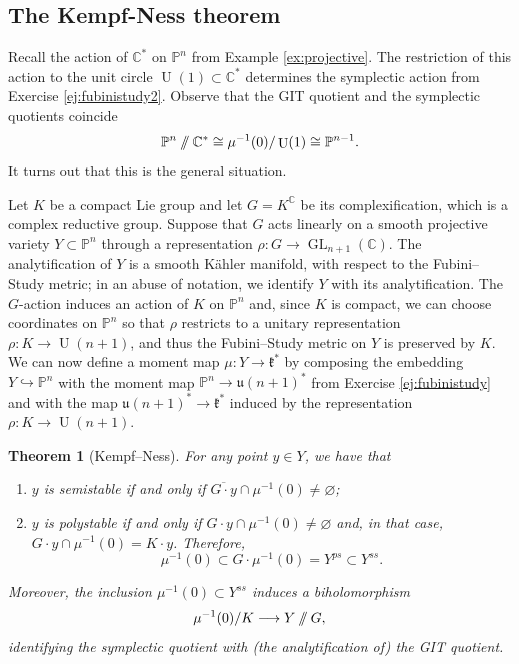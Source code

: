 \documentclass[12pt,a4paper]{amsbook}
\newtheorem{thm}{Theorem}[chapter]
\theoremstyle{remark} \newtheorem{rmk}[thm]{Remark}
\theoremstyle{definition} \newtheorem{defn}[thm]{Definition}
\theoremstyle{definition} \newtheorem{ex}[thm]{Example}
\theoremstyle{definition} \newtheorem{ej}{Exercise}
\newcommand{\git}{\mathbin{/\mkern-6mu/}}
\newcommand{\C}{\mathbb C}
\newcommand{\bbP}{\mathbb P}
\newcommand{\fk}{\mathfrak k}
\DeclareMathOperator{\GL}{GL}
\DeclareMathOperator{\U}{U}
\begin{document}
  \subsection*{The Kempf-Ness theorem}
  Recall the action of $\C^*$ on $\bbP^n$ from Example \ref{ex:projective}. The restriction of this action to the unit circle $\U(1)\subset \C^*$ determines the symplectic action from Exercise \ref{ej:fubinistudy2}. Observe that the GIT quotient and the symplectic quotients coincide
  \begin{equation*}
\bbP^n\git \C^* \cong \mu^{-1}(0)/ \U(1) \cong \bbP^{n-1}.
  \end{equation*}
  It turns out that this is the general situation.

  Let $K$ be a compact Lie group and let $G=K^{\C}$ be its complexification, which is a complex reductive group. Suppose that $G$ acts linearly on a smooth projective variety $Y\subset \bbP^n$ through a representation $\rho:G\rightarrow \GL_{n+1}(\C)$. The analytification of $Y$ is a smooth Kähler manifold, with respect to the Fubini--Study metric; in an abuse of notation, we identify $Y$ with its analytification. The $G$-action induces an action of $K$ on $\bbP^n$ and, since $K$ is compact, we can choose coordinates on $\bbP^n$ so that $\rho$ restricts to a unitary representation $\rho:K \rightarrow \U(n+1)$, and thus the Fubini--Study metric on $Y$ is preserved by $K$. We can now define a moment map $\mu:Y\rightarrow \fk^*$ by composing the embedding $Y\hookrightarrow \bbP^n$ with the moment map $\bbP^n\rightarrow \mathfrak{u}(n+1)^*$ from Exercise \ref{ej:fubinistudy} and with the map $\mathfrak{u}(n+1)^* \rightarrow \fk^*$ induced by the representation $\rho:K\rightarrow \U(n+1)$.

  \begin{thm}[Kempf--Ness]
    For any point $y\in Y$, we have that
    \begin{enumerate}
\item $y$ is semistable if and only if $\overline{G\cdot y} \cap \mu^{-1}(0)\neq \varnothing$;
      \item $y$ is polystable if and only if $G\cdot y \cap \mu^{-1}(0)\neq \varnothing$ and, in that case, $G\cdot y \cap \mu^{-1}(0)=K\cdot y$. Therefore,
            \begin{equation*}
\mu^{-1}(0) \subset G \cdot \mu^{-1}(0) = Y^{ps} \subset Y^{ss}.
            \end{equation*}
    \end{enumerate}
            Moreover, the inclusion $\mu^{-1}(0)\subset Y^{ss}$ induces a biholomorphism
           \begin{equation*}
\mu^{-1}(0)/K \longrightarrow Y \git G,
           \end{equation*}
           identifying the symplectic quotient with (the analytification of) the GIT quotient.
  \end{thm}
\end{document}

